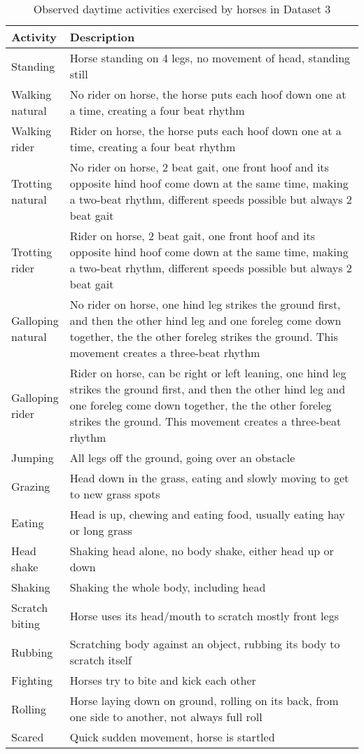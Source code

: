 \begin{table}[!htb]
	\centering
	\caption{Observed daytime activities exercised by horses in Dataset 3}
	\label{tab:dataset_horse_activities}
		\begin{tabular}{p{0.15\linewidth}p{0.85\linewidth}}
			\toprule
			\textbf{Activity} & \textbf{Description} \\ \midrule
    	
Standing & Horse standing on 4 legs, no movement of head, standing still \\
Walking natural & No rider on horse, the horse puts each hoof down one at a time, creating a four beat rhythm \\
Walking rider & Rider on horse, the horse puts each hoof down one at a time, creating a four beat rhythm \\
Trotting natural & No rider on horse, 2 beat gait, one front hoof and its opposite hind hoof come down at the same time, making a two-beat rhythm, different speeds possible but always 2 beat gait \\
Trotting rider & Rider on horse, 2 beat gait, one front hoof and its opposite hind hoof come down at the same time, making a two-beat rhythm, different speeds possible but always 2 beat gait \\
Galloping natural & No rider on horse, one hind leg strikes the ground first, and then the other hind leg and one foreleg come down together, the the other foreleg strikes the ground. This movement creates a three-beat rhythm  \\
Galloping rider & Rider on horse, can be right or left leaning, one hind leg strikes the ground first, and then the other hind leg and one foreleg come down together, the the other foreleg strikes the ground. This movement creates a three-beat rhythm  \\
Jumping & All legs off the ground, going over an obstacle  \\
Grazing & Head down in the grass, eating and slowly moving to get to new grass spots \\
Eating & Head is up, chewing and eating food, usually eating hay or long grass  \\
Head shake & Shaking head alone, no body shake, either head up or down  \\
Shaking & Shaking the whole body, including head \\
Scratch biting & Horse uses its head/mouth to scratch mostly front legs \\
Rubbing & Scratching body against an object, rubbing its body to scratch itself  \\
Fighting & Horses try to bite and kick each other \\
Rolling & Horse laying down on ground, rolling on its back, from one side to another, not always full roll \\
Scared & Quick sudden movement, horse is startled  \\
    	
			\bottomrule
		\end{tabular}
\end{table}
